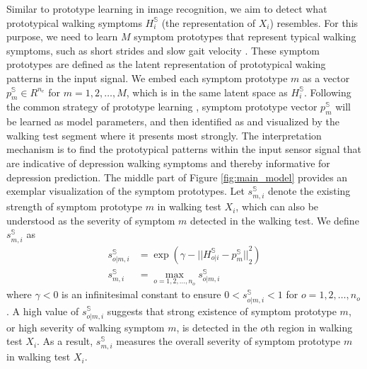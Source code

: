 \documentclass[mnsc]{informs3b} %
\begin{document}
Similar to prototype learning in image recognition, we aim to detect what prototypical walking symptoms $H_{i}^{\mathbb{S}}$ (the representation of $X_i$) resembles. For this purpose, we need to learn $M$ symptom prototypes that represent typical walking symptoms, such as short strides and slow gait velocity \citep{lemke_spatiotemporal_2000, michalak_embodiment_2009, czech_gaitpy_2019}. These symptom prototypes are defined as the latent representation of prototypical waking patterns in the input signal. We embed each symptom prototype $m$ as a vector $p_m^{\mathbb{S}} \in R^{n_e}$ for $m=1,2,\dots,M$, which is in the same latent space as $H_{i}^{\mathbb{S}}$. Following the common strategy of prototype learning \citep{chen_this_2019}, symptom prototype vector $p_m^{\mathbb{S}}$ will be learned as model parameters, and then identified as and visualized by the walking test segment where it presents most strongly. The interpretation mechanism is to find the prototypical patterns within the input sensor signal that are indicative of depression walking symptoms and thereby informative for depression prediction. The middle part of Figure \ref{fig:main_model} provides an exemplar visualization of the symptom prototypes.
Let $s_{m,i}^{\mathbb{S}}$ denote the existing strength of symptom prototype $m$ in walking test $X_i$, which can also be understood as the severity of symptom $m$ detected in the walking test. We define $s_{m,i}^{\mathbb{S}}$ as
\begin{subequations}
\label{eq:s_m_i}
\begin{align}
  s_{o|m,i}^{\mathbb{S}} &= \exp⁡(\gamma -{||H_{o|i}^{\mathbb{S}}-p_m^{\mathbb{S}}||}_2^2) \\
  s_{m,i}^{\mathbb{S}} &= \max_{o=1,2,\dots,n_o} s_{o|m,i}^{\mathbb{S}}
\end{align}
\end{subequations}
where $\gamma < 0$ is an infinitesimal constant to ensure $0 < s_{o|m,i}^{\mathbb{S}} < 1$ for $o=1,2,\dots,n_o$.
A high value of $s_{o|m,i}^{\mathbb{S}}$ suggests that strong existence of symptom prototype $m$, or high severity of walking symptom $m$, is detected in the $o$th region in walking test $X_i$. As a result, $s_{m,i}^{\mathbb{S}}$ measures the overall severity of symptom prototype $m$ in walking test $X_i$. 
\end{document}
